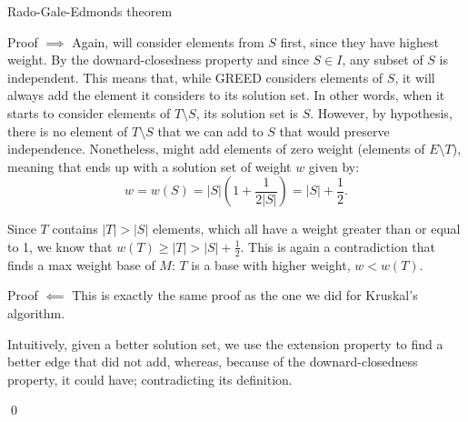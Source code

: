 \documentclass[a4paper]{article}
\begin{document}
\begin{parag}{Rado-Gale-Edmonds theorem}
\begin{subparag}{Proof $\implies$}
        Again,  will consider elements from $S$ first, since they have highest weight. By the downard-closedness property and since $S \in I$, any subset of $S$ is independent. This means that, while GREED considers elements of $S$, it will always add the element it considers to its solution set. In other words, when it starts to consider elements of $T \setminus S$, its solution set is $S$. However, by hypothesis, there is no element of $T \setminus S$ that we can add to $S$ that would preserve independence. Nonetheless,  might add elements of zero weight (elements of $E \setminus T$), meaning that  ends up with a solution set of weight $w$ given by: 
        \[w = w\left(S\right) = \left|S\right| \left(1 + \frac{1}{2 \left|S\right|}\right) = \left|S\right| + \frac{1}{2}.\]

        Since $T$ contains $\left|T\right| > \left|S\right|$ elements, which all have a weight greater than or equal to 1, we know that $w\left(T\right) \geq \left|T\right| > \left|S\right| + \frac{1}{2}$. This is again a contradiction that  finds a max weight base of $M$: $T$ is a base with higher weight, $w < w\left(T\right)$.
   \end{subparag}

    \begin{subparag}{Proof $\impliedby$}
        This is exactly the same proof as the one we did for Kruskal's algorithm.

        Intuitively, given a better solution set, we use the extension property to find a better edge that  did not add, whereas, because of the downard-closedness property, it could have; contradicting its definition.

        \qed
    \end{subparag}
\end{parag}

 
\end{document}
